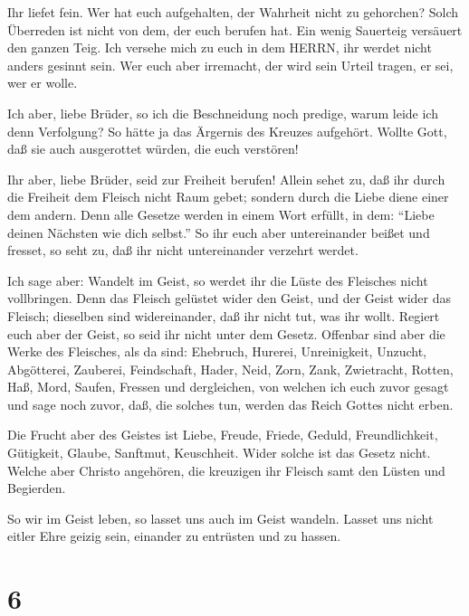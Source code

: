  Ihr liefet fein. Wer hat euch aufgehalten, der Wahrheit
nicht zu gehorchen?  Solch Überreden ist nicht von dem, der
euch berufen hat.  Ein wenig Sauerteig versäuert den ganzen
Teig.  Ich versehe mich zu euch in dem HERRN, ihr werdet
nicht anders gesinnt sein. Wer euch aber irremacht, der wird sein Urteil
tragen, er sei, wer er wolle.

 Ich aber, liebe Brüder, so ich die Beschneidung noch
predige, warum leide ich denn Verfolgung? So hätte ja das Ärgernis des
Kreuzes aufgehört.  Wollte Gott, daß sie auch ausgerottet
würden, die euch verstören!

 Ihr aber, liebe Brüder, seid zur Freiheit berufen! Allein
sehet zu, daß ihr durch die Freiheit dem Fleisch nicht Raum gebet;
sondern durch die Liebe diene einer dem andern.  Denn alle
Gesetze werden in einem Wort erfüllt, in dem: ``Liebe deinen Nächsten
wie dich selbst.''  So ihr euch aber untereinander beißet
und fresset, so seht zu, daß ihr nicht untereinander verzehrt werdet.

 Ich sage aber: Wandelt im Geist, so werdet ihr die Lüste
des Fleisches nicht vollbringen.  Denn das Fleisch gelüstet
wider den Geist, und der Geist wider das Fleisch; dieselben sind
widereinander, daß ihr nicht tut, was ihr wollt.  Regiert
euch aber der Geist, so seid ihr nicht unter dem Gesetz. 
Offenbar sind aber die Werke des Fleisches, als da sind: Ehebruch,
Hurerei, Unreinigkeit, Unzucht,  Abgötterei, Zauberei,
Feindschaft, Hader, Neid, Zorn, Zank, Zwietracht, Rotten, Haß, Mord,
 Saufen, Fressen und dergleichen, von welchen ich euch
zuvor gesagt und sage noch zuvor, daß, die solches tun, werden das Reich
Gottes nicht erben.

 Die Frucht aber des Geistes ist Liebe, Freude, Friede,
Geduld, Freundlichkeit, Gütigkeit, Glaube, Sanftmut, Keuschheit.
 Wider solche ist das Gesetz nicht.  Welche
aber Christo angehören, die kreuzigen ihr Fleisch samt den Lüsten und
Begierden.

 So wir im Geist leben, so lasset uns auch im Geist
wandeln.  Lasset uns nicht eitler Ehre geizig sein,
einander zu entrüsten und zu hassen.

\hypertarget{section-5}{%
\section{6}\label{section-5}}

